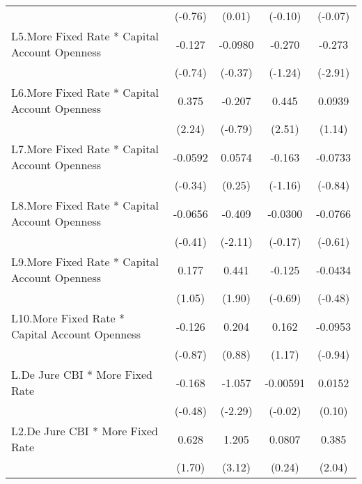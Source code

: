 {\begin{longtable}{l*{4}{c}}
                &  (-0.76)         &   (0.01)         &  (-0.10)         &  (-0.07)         \\
\addlinespace
L5.More Fixed Rate * Capital Account Openness&   -0.127         &  -0.0980         &   -0.270         &   -0.273\sym{**} \\
                &  (-0.74)         &  (-0.37)         &  (-1.24)         &  (-2.91)         \\
\addlinespace
L6.More Fixed Rate * Capital Account Openness&    0.375\sym{*}  &   -0.207         &    0.445\sym{*}  &   0.0939         \\
                &   (2.24)         &  (-0.79)         &   (2.51)         &   (1.14)         \\
\addlinespace
L7.More Fixed Rate * Capital Account Openness&  -0.0592         &   0.0574         &   -0.163         &  -0.0733         \\
                &  (-0.34)         &   (0.25)         &  (-1.16)         &  (-0.84)         \\
\addlinespace
L8.More Fixed Rate * Capital Account Openness&  -0.0656         &   -0.409\sym{*}  &  -0.0300         &  -0.0766         \\
                &  (-0.41)         &  (-2.11)         &  (-0.17)         &  (-0.61)         \\
\addlinespace
L9.More Fixed Rate * Capital Account Openness&    0.177         &    0.441         &   -0.125         &  -0.0434         \\
                &   (1.05)         &   (1.90)         &  (-0.69)         &  (-0.48)         \\
\addlinespace
L10.More Fixed Rate * Capital Account Openness&   -0.126         &    0.204         &    0.162         &  -0.0953         \\
                &  (-0.87)         &   (0.88)         &   (1.17)         &  (-0.94)         \\
\addlinespace
L.De Jure CBI * More Fixed Rate&   -0.168         &   -1.057\sym{*}  & -0.00591         &   0.0152         \\
                &  (-0.48)         &  (-2.29)         &  (-0.02)         &   (0.10)         \\
\addlinespace
L2.De Jure CBI * More Fixed Rate&    0.628         &    1.205\sym{**} &   0.0807         &    0.385\sym{*}  \\
                &   (1.70)         &   (3.12)         &   (0.24)         &   (2.04)         \\

\end{longtable}}
